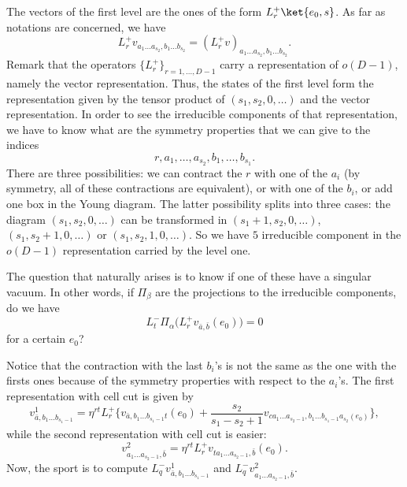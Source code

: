 The vectors of the first level are the ones of the form	$L^+_r\ket{e_0,s}$. As far as notations are concerned, we have
\begin{equation}
	L^+_rv_{a_1\ldots a_{s_2},b_1\ldots b_{s_2}}=(L^+_rv)_{a_1\ldots a_{s_2},b_1\ldots b_{s_2}}.
\end{equation}
Remark that the operators $\{ L_r^+ \}_{r=1,\ldots,D-1}$ carry a representation of $o(D-1)$, namely the vector representation. Thus, the states of the first level form the representation given by the tensor product of $(s_1,s_2,0,\ldots)$ and the vector representation. In order to see the irreducible components of that representation, we have to know what are the symmetry properties that we can give to the indices
\begin{equation}
	r,a_1,\ldots,a_{s_2},b_1,\ldots,b_{s_1}.
\end{equation}
There are three possibilities: we can contract the $r$ with one of the $a_i$ (by symmetry, all of these contractions are equivalent), or with one of the $b_i$, or add one box in the Young diagram. The latter possibility splits into three cases: the diagram $(s_1,s_2,0,\ldots)$ can be transformed in $(s_1+1,s_2,0,\ldots)$, $(s_1,s_2+1,0,\ldots)$ or $(s_1,s_2,1,0,\ldots)$. So we have $5$ irreducible component in the $o(D-1)$ representation carried by the level one.

The question that naturally arises is to know if one of these have a singular vacuum. In other words, if $\Pi_{\beta}$ are the projections to the irreducible components, do we have
\begin{equation}
	L^-_{t}\Pi_{\alpha}\big( L^+_rv_{\bar a,\bar b}(e_0) \big)=0
\end{equation}
for a certain $e_0$?

Notice that the contraction with the last $b_i$'s is not the same as the one with the firsts ones because of the symmetry properties with respect to the $a_i$'s. The first representation with cell cut is given by
\begin{equation}
	v^1_{\bar a,b_1\ldots b_{s_1-1}}	=\eta^{rt}L^+_r\big\{ v_{\bar a,b_1 \ldots b_{s_1-1}t}(e_0)
							+\frac{ s_2 }{ s_1-s_2+1 } v_{ca_1\ldots a_{s_2-1},b_1\ldots b_{s_1-1}a_{s_2}(e_0)}\big\},
\end{equation}
while the second representation with cell cut is easier:
\begin{equation}
	v^2_{a_1\ldots a_{s_{2}-1},\bar b}=\eta^{rt}L^+_rv_{ta_1\ldots a_{s_2-1},\bar b}(e_0).
\end{equation}
Now, the sport is to compute $L^-_qv^1_{\bar a,b_1\ldots b_{s_1-1}}$ and $L^-_q v^2_{a_1\ldots a_{s_{2}-1},\bar b}$.

